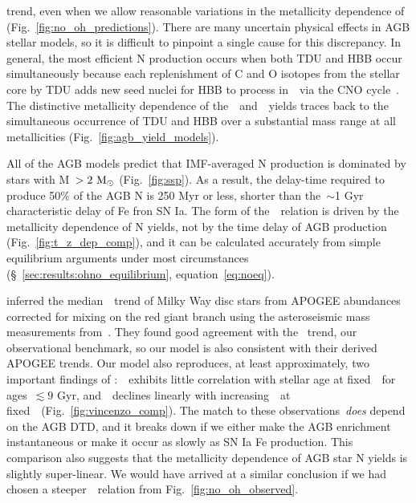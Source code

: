 \documentclass[ms.tex]{subfiles}
\begin{document}
\citet{Dopita2016} trend, even when we allow reasonable variations in the
metallicity dependence of~ (Fig.~\ref{fig:no_oh_predictions}).
There are many uncertain physical effects in AGB stellar models, so it is
difficult to pinpoint a single cause for this discrepancy.
In general, the most efficient N production occurs when both TDU and HBB occur
simultaneously because each replenishment of C and O isotopes from the stellar
core by TDU adds new seed nuclei for HBB to process in~\Nfourteen~via the CNO
cycle~\citep{Ventura2013}.
The distinctive metallicity dependence of the~\karakasten~and~\karakas~yields
traces back to the simultaneous occurrence of TDU and HBB over a substantial
mass range at all metallicities (Fig.~\ref{fig:agb_yield_models}).
\par
All of the AGB models predict that IMF-averaged N production is dominated by
stars with M~$> 2~\text{M}_\odot$ (Fig.~\ref{fig:ssp}).
As a result, the delay-time required to produce 50\% of the AGB N is 250 Myr or
less, shorter than the~$\sim$1 Gyr characteristic delay of Fe fron SN Ia.
The form of the~\ohno~relation is driven by the metallicity dependence of N
yields, not by the time delay of AGB production (Fig.~\ref{fig:t_z_dep_comp}),
and it can be calculated accurately from simple equilibrium arguments under
most circumstances (\S~\ref{sec:results:ohno_equilibrium},
equation~\ref{eq:noeq}).
\par
\citet{Vincenzo2021} inferred the median~\ohno~trend of Milky Way disc stars
from APOGEE abundances corrected for mixing on the red giant branch using the
asteroseismic mass measurements from~\citet{Miglio2021}.
They found good agreement with the~\citet{Dopita2016} trend, our observational
benchmark, so our model is also consistent with their derived APOGEE trends.
Our model also reproduces, at least approximately, two important findings of
\citet{Vincenzo2021}:~\no~exhibits little correlation with stellar age at
fixed~\feh~for ages~$\lesssim 9$ Gyr, and~\no~declines linearly with
increasing~\ofe~at fixed~\oh~(Fig.~\ref{fig:vincenzo_comp}).
The match to these observations~\textit{does} depend on the AGB DTD, and it
breaks down if we either make the AGB enrichment instantaneous or make it occur
as slowly as SN Ia Fe production.
{\color{red} This comparison also suggests that the metallicity dependence of
AGB star N yields is slightly super-linear.
We would have arrived at a similar conclusion if we had chosen a
steeper~\ohno~relation from Fig.~\ref{fig:no_oh_observed}.
}
\end{document}
